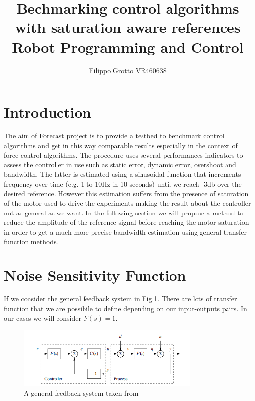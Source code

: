 \documentclass[a4paper,11pt]{article}
\begin{document}
\author{Filippo Grotto VR460638}

\title{Bechmarking control algorithms with saturation aware references \\[1ex] \large Robot Programming and Control}

\maketitle
\tableofcontents

\section{Introduction}
The aim of Forecast project \cite{Forecast} is to provide a testbed to benchmark control algorithms and get in this way comparable results especially in the context of force control algorithms. The procedure uses several performances indicators to assess the controller in use such as static error, dynamic error, overshoot and bandwidth. The latter is estimated using a sinusoidal function that increments frequency over time (e.g. 1 to 10Hz in 10 seconds) until we reach -3db over the desired reference. However this estimation suffers from the presence of saturation of the motor used to drive the experiments making the result about the controller not as general as we want. In the following section we will propose a method to reduce the amplitude of the reference signal before reaching the motor saturation in order to get a much more precise bandwidth estimation using general transfer function methods.

\newpage
\section{Noise Sensitivity Function}
If we consider the general feedback system in Fig.\ref{fig:feedback}. There are lots of transfer function that we are possibile to define depending on our input-outputs pairs. In our cases we will consider $F(s)=1$. 

\begin{figure}[H]
\begin{center}
\includegraphics[width=0.8\textwidth]{images/feedback.png}
\end{center}
\caption{A general feedback system taken from \cite{scientist}}
\label{fig:feedback}
\end{figure}
\end{document}
